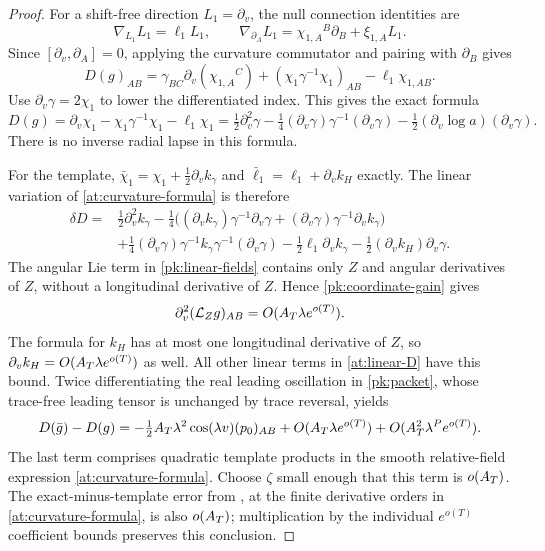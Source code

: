 \begin{proof}
For a shift-free direction $L_1=\partial_v$, the null connection
identities are
\[
 \nabla_{L_1}L_1=\ell_1L_1,\qquad
 \nabla_{\partial_A}L_1=\chi_{1,A}{}^B\partial_B+
                                                 \xi_{1,A}L_1.
\]
Since $[\partial_v,\partial_A]=0$, applying the curvature
commutator and pairing with $\partial_B$ gives
\[
 D(g)_{AB}=\gamma_{BC}\partial_v(\chi_{1,A}{}^C)
                    +(\chi_1\gamma^{-1}\chi_1)_{AB}
                    -\ell_1\chi_{1,AB}.
\]
Use $\partial_v\gamma=2\chi_1$ to lower the differentiated
index. This gives the exact formula
\begin{equation}\label{at:curvature-formula}
 D(g)=\partial_v\chi_1-\chi_1\gamma^{-1}\chi_1-\ell_1\chi_1
 =\tfrac12\partial_v^2\gamma
   -\tfrac14(\partial_v\gamma)\gamma^{-1}(\partial_v\gamma)
   -\tfrac12(\partial_v\log a)(\partial_v\gamma).
\end{equation}
There is no inverse radial lapse in this formula.

For the template, $\bar\chi_1=\chi_1+\tfrac12\partial_vk_\gamma$
and $\bar\ell_1=\ell_1+\partial_vk_H$ exactly. The linear
variation of \eqref{at:curvature-formula} is therefore
\begin{equation}\label{at:linear-D}
 \begin{split}
 \delta D={}&\tfrac12\partial_v^2k_\gamma
 -\tfrac14\bigl((\partial_vk_\gamma)\gamma^{-1}\partial_v\gamma
 +(\partial_v\gamma)\gamma^{-1}\partial_vk_\gamma\bigr)\\
 &+\tfrac14(\partial_v\gamma)\gamma^{-1}k_\gamma
                              \gamma^{-1}(\partial_v\gamma)
 -\tfrac12\ell_1\partial_vk_\gamma
 -\tfrac12(\partial_vk_H)\partial_v\gamma.
 \end{split}
\end{equation}
The angular Lie term in \eqref{pk:linear-fields} contains only
$Z$ and angular derivatives of $Z$, without a longitudinal
derivative of $Z$. Hence \eqref{pk:coordinate-gain} gives
\[
 \partial_v^2(\mathcal L_Zg)_{AB}=O(A_T\lambda e^{o(T)}).
\]
The formula for $k_H$ has at most one longitudinal derivative
of $Z$, so $\partial_vk_H=O(A_T\lambda e^{o(T)})$ as well.
All other linear terms in \eqref{at:linear-D} have this bound.
Twice differentiating the real leading oscillation in
\eqref{pk:packet}, whose trace-free leading tensor is unchanged
by trace reversal, yields
\begin{equation}\label{at:leading-signal}
 D(\bar g)-D(g)
 =-\tfrac12A_T\lambda^2\cos(\lambda v)(p_0)_{AB}
      +O(A_T\lambda e^{o(T)})
      +O(A_T^2\lambda^{P}e^{o(T)}).
\end{equation}
The last term comprises quadratic template products in the smooth
relative-field expression \eqref{at:curvature-formula}. Choose
$\zeta$ small enough that this term is $o(A_T)$.
The exact-minus-template error from ,
at the finite derivative orders in \eqref{at:curvature-formula},
is also $o(A_T)$; multiplication by the individual
$e^{o(T)}$ coefficient bounds preserves this conclusion.


\end{proof}
